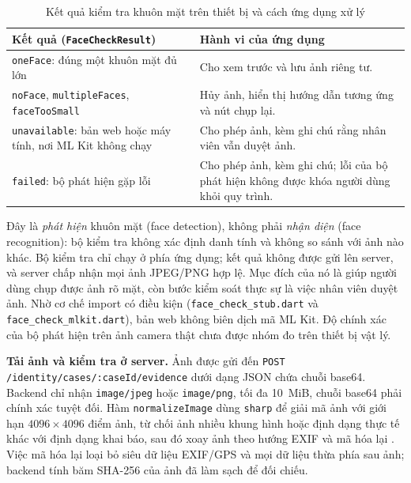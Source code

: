 \begin{table}[H]
	\centering
	\caption{Kết quả kiểm tra khuôn mặt trên thiết bị và cách ứng dụng xử lý}
	\label{tab:ch3-face}
	\small
	\begin{tabularx}{\textwidth}{@{}>{\raggedright\arraybackslash}p{6.2cm}X@{}}
		\toprule
		\textbf{Kết quả (\texttt{Face\allowbreak{}Check\allowbreak{}Result})} & \textbf{Hành vi của ứng dụng}\\
		\midrule
		\texttt{oneFace}: đúng một khuôn mặt đủ lớn & Cho xem trước và lưu ảnh riêng tư.\\
		\texttt{noFace}, \texttt{multipleFaces}, \texttt{faceTooSmall} & Hủy ảnh, hiển thị hướng dẫn tương ứng và nút chụp lại.\\
		\texttt{unavailable}: bản web hoặc máy tính, nơi ML Kit không chạy & Cho phép ảnh, kèm ghi chú rằng nhân viên vẫn duyệt ảnh.\\
		\texttt{failed}: bộ phát hiện gặp lỗi & Cho phép ảnh, kèm ghi chú; lỗi của bộ phát hiện không được khóa người dùng khỏi quy trình.\\
		\bottomrule
	\end{tabularx}
\end{table}

Đây là \emph{phát hiện} khuôn mặt (face detection), không phải \emph{nhận diện} (face recognition): bộ kiểm tra không xác định danh tính và không so sánh với ảnh nào khác. Bộ kiểm tra chỉ chạy ở phía ứng dụng; kết quả không được gửi lên server, và server chấp nhận mọi ảnh JPEG/PNG hợp lệ. Mục đích của nó là giúp người dùng chụp được ảnh rõ mặt, còn bước kiểm soát thực sự là việc nhân viên duyệt ảnh. Nhờ cơ chế import có điều kiện (\texttt{face\_\allowbreak{}check\_\allowbreak{}stub.\allowbreak{}dart} và \texttt{face\_\allowbreak{}check\_\allowbreak{}mlkit.\allowbreak{}dart}), bản web không biên dịch mã ML Kit. Độ chính xác của bộ phát hiện trên ảnh camera thật chưa được nhóm đo trên thiết bị vật lý.

\textbf{Tải ảnh và kiểm tra ở server.} Ảnh được gửi đến \texttt{POST /\allowbreak{}identity/\allowbreak{}cases/\allowbreak{}:caseId/\allowbreak{}evidence} dưới dạng JSON chứa chuỗi base64. Backend chỉ nhận \texttt{image/\allowbreak{}jpeg} hoặc \texttt{image/\allowbreak{}png}, tối đa 10~MiB, chuỗi base64 phải chính xác tuyệt đối. Hàm \texttt{normalize\allowbreak{}Image} dùng \texttt{sharp} để giải mã ảnh với giới hạn $4096 \times 4096$ điểm ảnh, từ chối ảnh nhiều khung hình hoặc định dạng thực tế khác với định dạng khai báo, sau đó xoay ảnh theo hướng EXIF và mã hóa lại \parencite{ch3-sharp}. Việc mã hóa lại loại bỏ siêu dữ liệu EXIF/GPS và mọi dữ liệu thừa phía sau ảnh; backend tính băm SHA-256 của ảnh đã làm sạch để đối chiếu.

